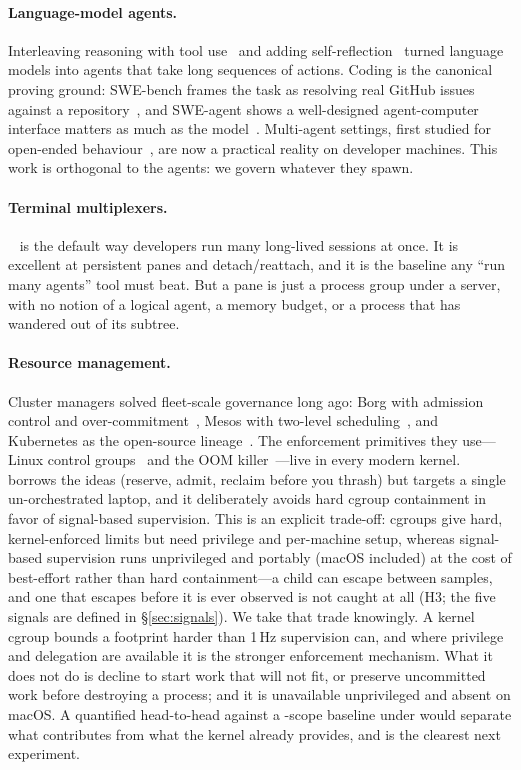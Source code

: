 \paragraph{Language-model agents.} Interleaving reasoning with tool use~\citep{yao2023react} and
adding self-reflection~\citep{shinn2023reflexion} turned language models into agents that take long
sequences of actions. Coding is the canonical proving ground: SWE-bench frames the task as resolving
real GitHub issues against a repository~\citep{jimenez2024swebench}, and SWE-agent shows a
well-designed agent-computer interface matters as much as the model~\citep{yang2024sweagent}.
Multi-agent settings, first studied for open-ended behaviour~\citep{park2023generative}, are now a
practical reality on developer machines. This work is orthogonal to the agents: we govern whatever
they spawn.

\paragraph{Terminal multiplexers.} ~\citep{tmux} is the default way developers run many
long-lived sessions at once. It is excellent at persistent panes and detach/reattach, and it is the
baseline any ``run many agents'' tool must beat. But a pane is just a process group under a server,
with no notion of a logical agent, a memory budget, or a process that has wandered out of its
subtree.

\paragraph{Resource management.} Cluster managers solved fleet-scale governance long ago: Borg with
admission control and over-commitment~\citep{verma2015borg}, Mesos with two-level
scheduling~\citep{hindman2011mesos}, and Kubernetes as the open-source lineage~\citep{kubernetes}.
The enforcement primitives they use---Linux control groups~\citep{cgroupv2} and the OOM
killer~\citep{linuxoom}---live in every modern kernel. \sys{} borrows the ideas (reserve, admit,
reclaim before you thrash) but targets a single un-orchestrated laptop, and it deliberately avoids
hard cgroup containment in favor of signal-based supervision. This is an explicit trade-off: cgroups
give hard, kernel-enforced limits but need privilege and per-machine setup, whereas signal-based
supervision runs unprivileged and portably (macOS included) at the cost of best-effort rather than
hard containment---a child can escape between samples, and one that escapes before it is ever
observed is not caught at all (H3; the five signals are defined in \S\ref{sec:signals}). We take that trade knowingly. A kernel cgroup bounds a footprint
harder than 1\,Hz supervision can, and where privilege and delegation are available it is the
stronger enforcement mechanism. What it does not do is decline to start work that will not fit, or
preserve uncommitted work before destroying a process; and it is unavailable unprivileged and absent
on macOS. A quantified head-to-head against a -scope baseline under 
would separate what \sys{} contributes from what the kernel already provides, and is the clearest
next experiment.

